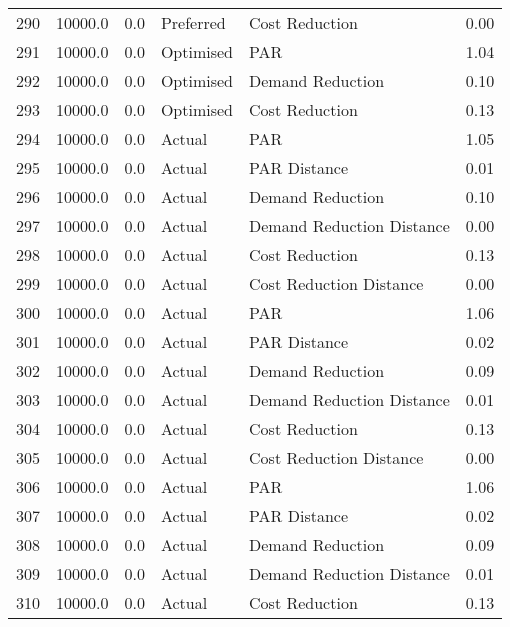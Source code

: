 \begin{longtable}{lrrllr}
290  &      10000.0 &     0.0 &      Preferred &             Cost Reduction &   0.00 \\
291  &      10000.0 &     0.0 &      Optimised &                        PAR &   1.04 \\
292  &      10000.0 &     0.0 &      Optimised &           Demand Reduction &   0.10 \\
293  &      10000.0 &     0.0 &      Optimised &             Cost Reduction &   0.13 \\
294  &      10000.0 &     0.0 &         Actual &                        PAR &   1.05 \\
295  &      10000.0 &     0.0 &         Actual &               PAR Distance &   0.01 \\
296  &      10000.0 &     0.0 &         Actual &           Demand Reduction &   0.10 \\
297  &      10000.0 &     0.0 &         Actual &  Demand Reduction Distance &   0.00 \\
298  &      10000.0 &     0.0 &         Actual &             Cost Reduction &   0.13 \\
299  &      10000.0 &     0.0 &         Actual &    Cost Reduction Distance &   0.00 \\
300  &      10000.0 &     0.0 &         Actual &                        PAR &   1.06 \\
301  &      10000.0 &     0.0 &         Actual &               PAR Distance &   0.02 \\
302  &      10000.0 &     0.0 &         Actual &           Demand Reduction &   0.09 \\
303  &      10000.0 &     0.0 &         Actual &  Demand Reduction Distance &   0.01 \\
304  &      10000.0 &     0.0 &         Actual &             Cost Reduction &   0.13 \\
305  &      10000.0 &     0.0 &         Actual &    Cost Reduction Distance &   0.00 \\
306  &      10000.0 &     0.0 &         Actual &                        PAR &   1.06 \\
307  &      10000.0 &     0.0 &         Actual &               PAR Distance &   0.02 \\
308  &      10000.0 &     0.0 &         Actual &           Demand Reduction &   0.09 \\
309  &      10000.0 &     0.0 &         Actual &  Demand Reduction Distance &   0.01 \\
310  &      10000.0 &     0.0 &         Actual &             Cost Reduction &   0.13 \\

\end{longtable}
